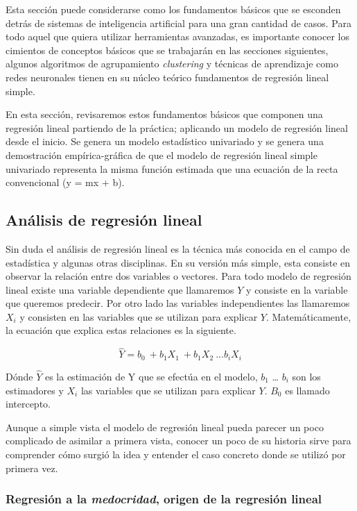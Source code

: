 \documentclass[letterpaper,12pt, spanish, oneside]{book} %
\begin{document}
Esta sección puede considerarse como los fundamentos básicos que se esconden detrás de sistemas de inteligencia artificial para una gran cantidad de casos. Para todo aquel que quiera utilizar herramientas avanzadas, es importante conocer los cimientos de conceptos básicos que se trabajarán en las secciones siguientes, algunos algoritmos de agrupamiento \textit{clustering} y técnicas de aprendizaje como redes neuronales tienen en su núcleo teórico fundamentos de regresión lineal simple.

En esta sección, revisaremos estos fundamentos básicos que componen una regresión lineal partiendo de la práctica; aplicando un modelo de regresión lineal desde el inicio. Se genera un modelo estadístico univariado y se genera una demostración empírica-gráfica de que el modelo de regresión lineal simple univariado representa la misma función estimada que una ecuación de la recta convencional (y = mx + b).

\subsection{Análisis de regresión lineal}

Sin duda el análisis de regresión lineal es la técnica más conocida en el campo de estadística y algunas otras disciplinas. En su versión más simple, esta consiste en observar la relación entre dos variables o vectores. Para todo modelo de regresión lineal existe una variable dependiente que llamaremos $Y$ y consiste en la variable que queremos predecir. Por otro lado las variables independientes las llamaremos $X_i$ y consisten en las variables que se utilizan para explicar $Y$. Matemáticamente, la ecuación que explica estas relaciones es la siguiente.

$$\hat{Y} = b_0 \ + b_1 X_1 \ + b_1 X_2 \ ... b_i X_i$$

Dónde $\hat{Y}$ es la estimación de Y que se efectúa en el modelo, $b_1$ … $b_i$ son los estimadores y $X_i$ las variables que se utilizan para explicar $Y$. $B_0$ es llamado intercepto.

Aunque a simple vista el modelo de regresión lineal pueda parecer un poco complicado de asimilar a primera vista, conocer un poco de su historia sirve para comprender cómo surgió la idea y entender el caso concreto donde se utilizó por primera vez.

\subsubsection{Regresión a la \textit{medocridad}, origen de la regresión lineal}
\end{document}
